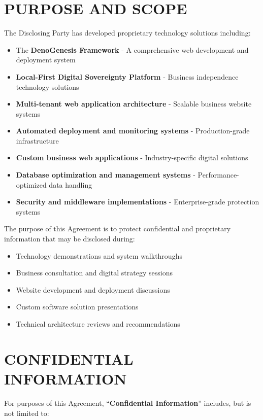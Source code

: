 \documentclass[11pt,letterpaper]{article}
\begin{document}
\section{PURPOSE AND SCOPE}

The Disclosing Party has developed proprietary technology solutions including:

\begin{itemize}[leftmargin=0.5cm]
    \item The \textbf{DenoGenesis Framework} - A comprehensive web development and deployment system
    \item \textbf{Local-First Digital Sovereignty Platform} - Business independence technology solutions
    \item \textbf{Multi-tenant web application architecture} - Scalable business website systems
    \item \textbf{Automated deployment and monitoring systems} - Production-grade infrastructure
    \item \textbf{Custom business web applications} - Industry-specific digital solutions
    \item \textbf{Database optimization and management systems} - Performance-optimized data handling
    \item \textbf{Security and middleware implementations} - Enterprise-grade protection systems
\end{itemize}

The purpose of this Agreement is to protect confidential and proprietary information that may be disclosed during:

\begin{itemize}[leftmargin=0.5cm]
    \item Technology demonstrations and system walkthroughs
    \item Business consultation and digital strategy sessions
    \item Website development and deployment discussions
    \item Custom software solution presentations
    \item Technical architecture reviews and recommendations
\end{itemize}

\section{CONFIDENTIAL INFORMATION}

For purposes of this Agreement, ``\textbf{Confidential Information}'' includes, but is not limited to:
\end{document}
